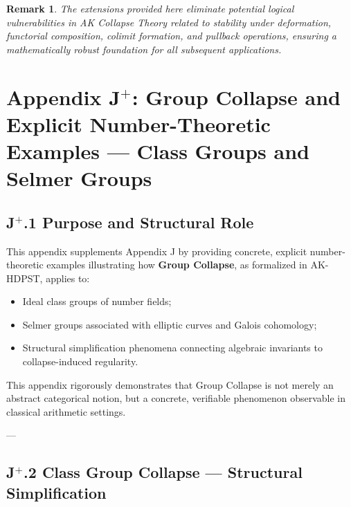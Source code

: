 \documentclass[11pt]{article}
\newtheorem{remark}[theorem]{Remark}
\begin{document}
\begin{remark}
The extensions provided here eliminate potential logical vulnerabilities in AK Collapse Theory related to stability under deformation, functorial composition, colimit formation, and pullback operations, ensuring a mathematically robust foundation for all subsequent applications.
\end{remark}




\section*{Appendix J$^{+}$: Group Collapse and Explicit Number-Theoretic Examples — Class Groups and Selmer Groups}

\subsection*{J$^{+}$.1 Purpose and Structural Role}

This appendix supplements Appendix J by providing concrete, explicit number-theoretic examples illustrating how \textbf{Group Collapse}, as formalized in AK-HDPST, applies to:

\begin{itemize}
    \item Ideal class groups of number fields;
    \item Selmer groups associated with elliptic curves and Galois cohomology;
    \item Structural simplification phenomena connecting algebraic invariants to collapse-induced regularity.
\end{itemize}

This appendix rigorously demonstrates that Group Collapse is not merely an abstract categorical notion, but a concrete, verifiable phenomenon observable in classical arithmetic settings.

---

\subsection*{J$^{+}$.2 Class Group Collapse — Structural Simplification}
\end{document}
